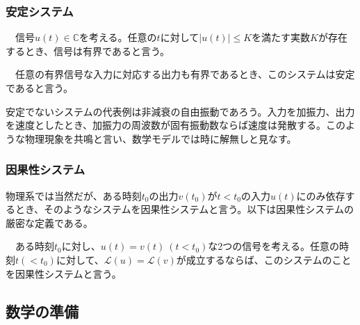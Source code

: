 \documentclass[dvipdfmx, 9pt, a4paper]{jsarticle}
\begin{document}
\subsubsection{安定システム}
\begin{tcolorbox}[title=有界信号]
　信号$u(t) \in \mathbb{C}$を考える。任意の$t$に対して$|u(t)| \leq K$を満たす実数$K$が存在するとき、信号は有界であると言う。
\end{tcolorbox}
\begin{tcolorbox}[title=安定システム]
　任意の有界信号な入力に対応する出力も有界であるとき、このシステムは安定であると言う。
\end{tcolorbox}
安定でないシステムの代表例は非減衰の自由振動であろう。入力を加振力、出力を速度としたとき、加振力の周波数が固有振動数ならば速度は発散する。このような物理現象を共鳴と言い、数学モデルでは時に解無しと見なす。

\subsubsection{因果性システム}
物理系では当然だが、ある時刻$t_0$の出力$v(t_0)$が$t<t_0$の入力$u(t)$にのみ依存するとき、そのようなシステムを因果性システムと言う。以下は因果性システムの厳密な定義である。
\begin{tcolorbox}[title=因果性システム]
　ある時刻$t_0$に対し、$u(t)=v(t)~(t<t_0)$な2つの信号を考える。任意の時刻$t(<t_0)$に対して、$\mathcal{L}(u)=\mathcal{L}(v)$が成立するならば、このシステムのことを因果性システムと言う。
\end{tcolorbox}

\subsection{数学の準備}
\end{document}
